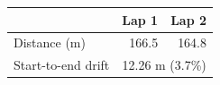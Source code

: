 \begin{tabular}{lrr}
\toprule
 & Lap 1 & Lap 2 \\
\midrule
Distance (m) & 166.5 & 164.8 \\
\midrule
Start-to-end drift & \multicolumn{2}{c}{12.26 m (3.7\%)} \\
\bottomrule
\end{tabular}
